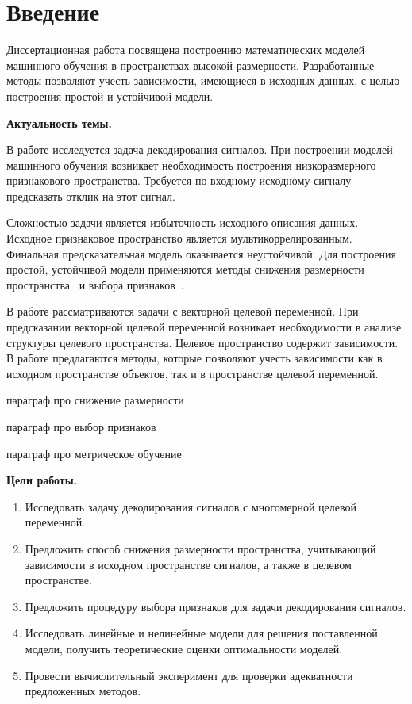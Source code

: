\chapter*{Введение}

Диссертационная работа посвящена построению математических моделей машинного обучения в пространствах высокой размерности.
Разработанные методы позволяют учесть зависимости, имеющиеся в исходных данных, с целью построения простой и устойчивой модели.


\textbf{Актуальность темы.} 

В работе исследуется задача декодирования сигналов. 
При построении моделей машинного обучения возникает необходимость построения низкоразмерного признакового пространства. 
Требуется по входному исходному сигналу предсказать отклик на этот сигнал.

Сложностью задачи является избыточность исходного описания данных. 
Исходное признаковое пространство является мультикоррелированным.
Финальная предсказательная модель оказывается неустойчивой.
Для построения простой, устойчивой модели применяются методы снижения размерности пространства~\cite{chun2010sparse,mehmood2012review}  и выбора признаков~\cite{katrutsa2015stress,li2017feature}.

В работе рассматриваются задачи с векторной целевой переменной. 
При предсказании векторной целевой переменной возникает необходимости в анализе структуры целевого пространства.
Целевое пространство содержит зависимости.
В работе предлагаются методы, которые позволяют учесть зависимости как в исходном пространстве объектов, так и в пространстве целевой переменной.

{\color{red} параграф про снижение размерности}

{\color{red} параграф про выбор признаков}

{\color{red} параграф про метрическое обучение}

\vspace{0.5cm}
\textbf{Цели работы.}
\begin{enumerate}
	\item Исследовать задачу декодирования сигналов с многомерной целевой переменной.
	\item Предложить способ снижения размерности пространства, учитывающий зависимости в исходном пространстве сигналов, а также в целевом пространстве.
	\item Предложить процедуру выбора признаков для задачи декодирования сигналов.
	\item Исследовать линейные и нелинейные модели для решения поставленной модели, получить теоретические оценки оптимальности моделей.
	\item Провести вычислительный эксперимент для проверки адекватности предложенных методов.
\end{enumerate}


